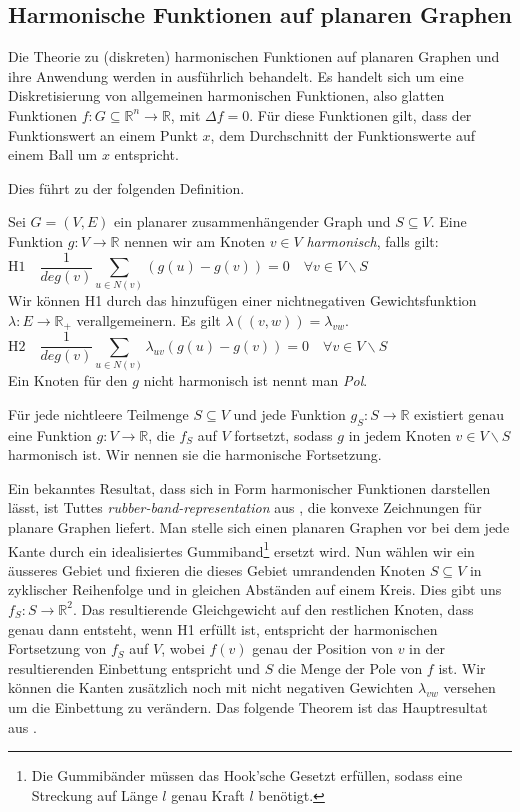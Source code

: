 \subsection{Harmonische Funktionen auf planaren Graphen}

Die Theorie zu (diskreten) harmonischen Funktionen auf planaren Graphen und ihre Anwendung werden in \cite{lov99} ausführlich behandelt. Es handelt sich um eine Diskretisierung von allgemeinen harmonischen Funktionen, also glatten Funktionen $f:G\subseteq \mathbb{R}^n \to \mathbb{R}$, mit $\Delta f = 0$. Für diese Funktionen gilt, dass der Funktionswert an einem Punkt $x$, dem Durchschnitt der Funktionswerte auf einem Ball um $x$ entspricht. 

Dies führt zu der folgenden Definition.

\begin{definition}
Sei $G=(V,E)$ ein planarer zusammenhängender Graph und $S \subseteq V$. Eine Funktion $g:V \to \mathbb{R}$ nennen wir am Knoten $v \in V$ \textit{harmonisch}, falls gilt:
$$ \text{H1} \quad \frac{1}{deg(v)} \sum_{u \in N(v)}(g(u) - g(v)) = 0 \quad \forall v \in V \backslash S \qquad\qquad\qquad\qquad\qquad\qquad\quad\:\,\:$$
Wir können H1 durch das hinzufügen einer nichtnegativen Gewichtsfunktion $\lambda:E\to\mathbb{R}_+$ verallgemeinern. Es gilt $\lambda((v,w)) = \lambda_{vw}$.
$$ \text{H2}\quad\frac{1}{deg(v)} \sum_{u \in N(v)}\lambda_{uv}(g(u) - g(v)) = 0 \quad \forall v \in V \backslash S \qquad\qquad\qquad\qquad\qquad\qquad$$
Ein Knoten für den $g$ nicht harmonisch ist nennt man \textit{Pol}.
\end{definition}

\begin{theorem}\cite[Theorem 3.1.2]{lov99}\label{harmonic_uni}
Für jede nichtleere Teilmenge $S \subseteq V$ und jede Funktion $g_S:S\to\mathbb{R}$ existiert genau eine Funktion $g:V\to\mathbb{R}$, die $f_S$ auf $V$ fortsetzt, sodass $g$ in jedem Knoten $v\in V \backslash S$ harmonisch ist. Wir nennen sie die \textup{harmonische Fortsetzung}.
\end{theorem}

Ein bekanntes Resultat, dass sich in Form harmonischer Funktionen darstellen lässt, ist Tuttes \textit{rubber-band-representation} aus \cite{tutte63}, die konvexe Zeichnungen für planare Graphen liefert. Man stelle sich einen planaren Graphen vor bei dem jede Kante durch ein idealisiertes Gummiband\footnote{Die Gummibänder müssen das Hook'sche Gesetzt erfüllen, sodass eine Streckung auf Länge $l$ genau Kraft $l$ benötigt.} ersetzt wird. Nun wählen wir ein äusseres Gebiet und fixieren die dieses Gebiet umrandenden Knoten $S\subseteq V$ in zyklischer Reihenfolge und in gleichen Abständen auf einem Kreis. Dies gibt uns $f_S:S \to \mathbb{R}^2$. Das resultierende Gleichgewicht auf den restlichen Knoten, dass genau dann entsteht, wenn H1 erfüllt ist, entspricht der harmonischen Fortsetzung von $f_S$  auf $V$, wobei $f(v)$ genau der Position von $v$ in der resultierenden Einbettung entspricht und $S$ die Menge der Pole von $f$ ist. Wir können die Kanten zusätzlich noch mit nicht negativen Gewichten $\lambda_{vw}$ versehen um die Einbettung zu verändern. Das folgende Theorem ist das Hauptresultat aus \cite{tutte63}.

